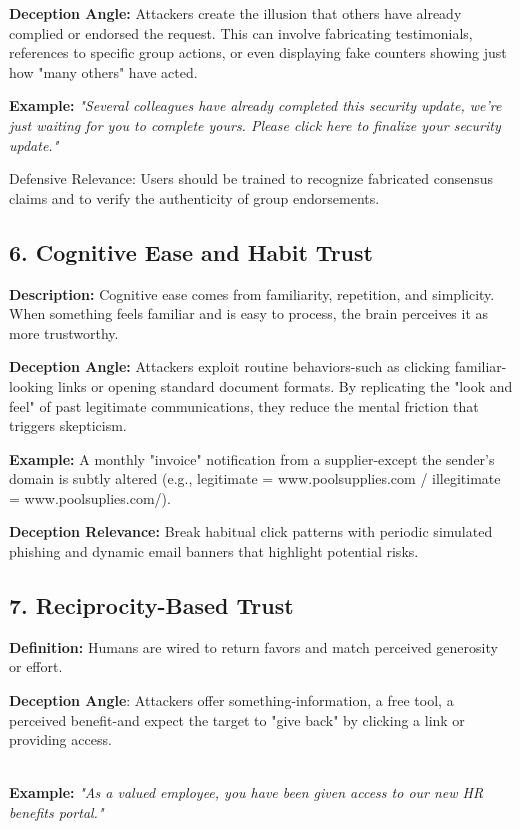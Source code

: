 \textbf{Deception Angle:} Attackers create the illusion that others have already complied or endorsed the request. This can involve fabricating testimonials, references to specific group actions, or even displaying fake counters showing just how "many others" have acted.

\textbf{Example:} \textit{"Several colleagues have already completed this security update, we're just waiting for you to complete yours. Please click here to finalize your security update."}

\begin{svgraybox}
Defensive Relevance:
Users should be trained to recognize fabricated consensus claims and to verify the authenticity of group endorsements.
\end{svgraybox}

\subsection{6. Cognitive Ease and Habit Trust}
\textbf{Description:} Cognitive ease comes from familiarity, repetition, and simplicity. When something feels familiar and is easy to process, the brain perceives it as more trustworthy.

\textbf{Deception Angle:} Attackers exploit routine behaviors-such as clicking familiar-looking links or opening standard document formats. By replicating the "look and feel" of past legitimate communications, they reduce the mental friction that triggers skepticism.

\textbf{Example:} A monthly "invoice" notification from a supplier-except the sender's domain is subtly altered (e.g., legitimate = www.poolsupplies.com / illegitimate = www.poolsuplies.com/).

\begin{svgraybox}
\textbf{Deception Relevance:}
Break habitual click patterns with periodic simulated phishing and dynamic email banners that highlight potential risks.
\end{svgraybox}

\subsection{7. Reciprocity-Based Trust}
\justifying
\noindent\textbf{Definition: }Humans are wired to return favors and match perceived generosity or effort.
{\justifying
\par\noindent\textbf{Deception Angle}: Attackers offer something-information, a free tool, a perceived benefit-and expect the target to "give back" by clicking a link or providing access.} \\
{\justifying
\textbf{Example:} \textit{"As a valued employee, you have been given access to our new HR benefits portal."}}

